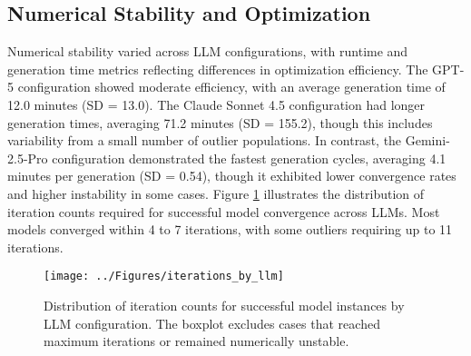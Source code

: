 \subsection{Numerical Stability and Optimization}
Numerical stability varied across LLM configurations, with runtime and generation time metrics reflecting differences in optimization efficiency. The GPT-5 configuration showed moderate efficiency, with an average generation time of 12.0 minutes (SD = 13.0). The Claude Sonnet 4.5 configuration had longer generation times, averaging 71.2 minutes (SD = 155.2), though this includes variability from a small number of outlier populations. In contrast, the Gemini-2.5-Pro configuration demonstrated the fastest generation cycles, averaging 4.1 minutes per generation (SD = 0.54), though it exhibited lower convergence rates and higher instability in some cases.
Figure \ref{fig:iterations_by_llm} illustrates the distribution of iteration counts required for successful model convergence across LLMs. Most models converged within 4 to 7 iterations, with some outliers requiring up to 11 iterations.
\begin{figure}[H]
\centering
\texttt{[image: ../Figures/iterations\_by\_llm]}
\caption{Distribution of iteration counts for successful model instances by LLM configuration. The boxplot excludes cases that reached maximum iterations or remained numerically unstable.}
\label{fig:iterations_by_llm}
\end{figure}



% 

